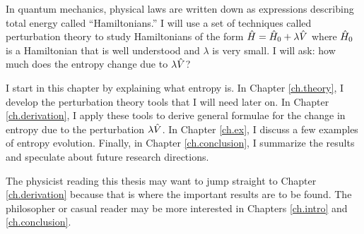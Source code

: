 
In quantum mechanics, physical laws are written down as expressions describing total energy called ``Hamiltonians.'' I will use a set of techniques called perturbation theory to study Hamiltonians of the form \(\hat{H} = \hat{H}_0 + \lambda \hat{V}\) where \(\hat{H}_0\) is a Hamiltonian that is well understood and \(\lambda\) is very small. I will ask: how much does the entropy change due to \(\lambda \hat{V}\)?

I start in this chapter by explaining what entropy is. In Chapter \ref{ch.theory}, I develop the perturbation theory tools that I will need later on. In Chapter \ref{ch.derivation}, I apply these tools to derive general formulae for the change in entropy due to the perturbation \(\lambda \hat{V}\). In Chapter \ref{ch.ex}, I discuss a few examples of entropy evolution. Finally, in Chapter \ref{ch.conclusion}, I summarize the results and speculate about future research directions.

The physicist reading this thesis may want to jump straight to Chapter \ref{ch.derivation} because that is where the important results are to be found. The philosopher or casual reader may be more interested in Chapters \ref{ch.intro} and \ref{ch.conclusion}.
